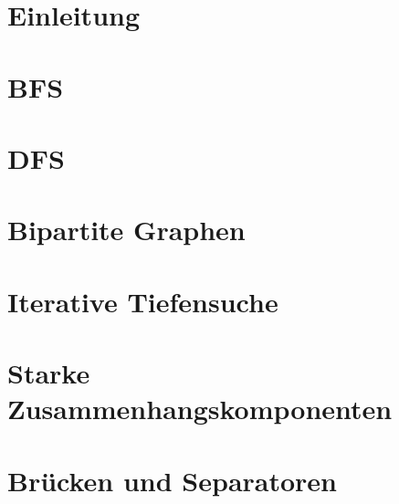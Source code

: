 

\setlength\textheight{7cm} %
	\begin{frame}
		\maketitle
	\end{frame}
	
	\section{Einleitung}
	
	\section{BFS}
	
	\section{DFS}
	
	\section{Bipartite Graphen}
	
	\section{Iterative Tiefensuche}
	
	\section{Starke Zusammenhangskomponenten}
	
	\section{Brücken und Separatoren}
	
